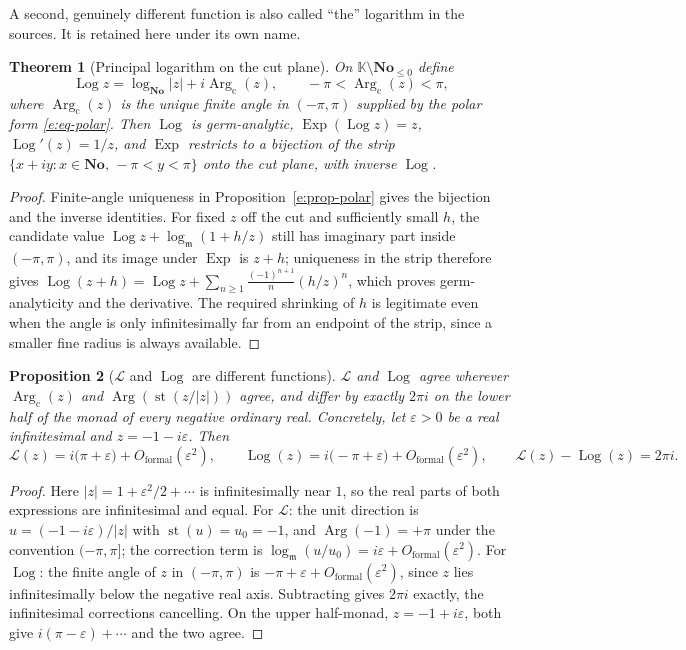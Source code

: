\documentclass[11pt,a4paper]{article}
\numberwithin{equation}{section}
\newtheorem{theorem}{Theorem}[section]
\newtheorem{proposition}[theorem]{Proposition}
\theoremstyle{definition}
\theoremstyle{remark}
\theoremstyle{plain}
\newcommand{\K}{\mathbb K}
\newcommand{\No}{\mathbf{No}}
\newcommand{\mm}{\mathfrak m}
\DeclareMathOperator{\st}{st}
\DeclareMathOperator{\Arg}{Arg}
\DeclareMathOperator{\Log}{Log}
\DeclareMathOperator{\Exp}{Exp}
\newcommand{\abs}[1]{\lvert #1\rvert}
\begin{document}
A second, genuinely different function is also called ``the'' logarithm in
the sources.  It is retained here under its own name.

\begin{theorem}[Principal logarithm on the cut plane]\label{e:thm-principallog}
On $\K\setminus\No_{\le0}$ define
\[
 \Log z=\log_{\No}\abs z+i\Arg_{\mathrm c}(z),
 \qquad -\pi<\Arg_{\mathrm c}(z)<\pi,
\]
where $\Arg_{\mathrm c}(z)$ is the unique finite angle in $(-\pi,\pi)$
supplied by the polar form \eqref{e:eq-polar}.  Then $\Log$ is
germ-analytic, $\Exp(\Log z)=z$, $\Log'(z)=1/z$, and $\Exp$ restricts to a
bijection of the strip $\{x+iy:x\in\No,\,-\pi<y<\pi\}$ onto the cut plane,
with inverse $\Log$.
\end{theorem}

\begin{proof}
Finite-angle uniqueness in Proposition~\ref{e:prop-polar} gives the
bijection and the inverse identities.  For fixed $z$ off the cut and
sufficiently small $h$, the candidate value
$\Log z+\log_{\mm}(1+h/z)$ still has imaginary part inside $(-\pi,\pi)$,
and its image under $\Exp$ is $z+h$; uniqueness in the strip therefore
gives
$\Log(z+h)=\Log z+\sum_{n\ge1}\frac{(-1)^{n+1}}{n}(h/z)^n$, which proves
germ-analyticity and the derivative.  The required shrinking of $h$ is
legitimate even when the angle is only infinitesimally far from an
endpoint of the strip, since a smaller fine radius is always available.
\end{proof}

\begin{proposition}[$\mathcal L$ and $\Log$ are different functions]
\label{e:prop-logdiscrepancy}
$\mathcal L$ and $\Log$ agree wherever
$\Arg_{\mathrm c}(z)$ and $\Arg(\st(z/\abs z))$ agree, and differ by
exactly $2\pi i$ on the lower half of the monad of every negative ordinary real.
Concretely, let $\varepsilon>0$ be a real infinitesimal and
$z=-1-i\varepsilon$.  Then
\[
 \mathcal L(z)=i\bigl(\pi+\varepsilon\bigr)+O_{\mathrm{formal}}(\varepsilon^{2}),
 \qquad
 \Log(z)=i\bigl(-\pi+\varepsilon\bigr)+O_{\mathrm{formal}}(\varepsilon^{2}),
 \qquad
 \mathcal L(z)-\Log(z)=2\pi i .
\]
\end{proposition}

\begin{proof}
Here $\abs z=1+\varepsilon^{2}/2+\cdots$ is infinitesimally near $1$, so
the real parts of both expressions are infinitesimal and equal.  For
$\mathcal L$: the unit direction is
$u=(-1-i\varepsilon)/\abs z$ with $\st(u)=u_0=-1$, and
$\Arg(-1)=+\pi$ under the convention $(-\pi,\pi]$; the correction term is
$\log_{\mm}(u/u_0)=i\varepsilon+O_{\mathrm{formal}}(\varepsilon^{2})$.
For $\Log$: the finite angle of $z$ in $(-\pi,\pi)$ is
$-\pi+\varepsilon+O_{\mathrm{formal}}(\varepsilon^{2})$, since $z$ lies
infinitesimally below the negative real axis.  Subtracting gives
$2\pi i$ exactly, the infinitesimal corrections cancelling.  On the upper
half-monad, $z=-1+i\varepsilon$, both give
$i(\pi-\varepsilon)+\cdots$ and the two agree.
\end{proof}
\end{document}
